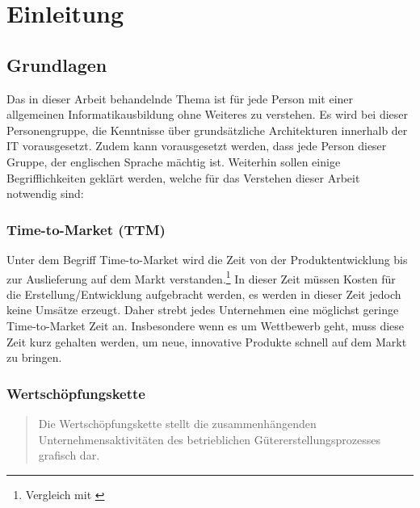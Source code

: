 \chapter{Einleitung}
\label{chap:einleitung}

\section{Grundlagen}
\label{sec:Grundlagen}
Das in dieser Arbeit behandelnde Thema ist für jede Person mit einer allgemeinen Informatikausbildung ohne Weiteres zu verstehen. Es wird bei dieser Personengruppe, die Kenntnisse über grundsätzliche Architekturen innerhalb der IT vorausgesetzt. Zudem kann vorausgesetzt werden, dass jede Person dieser Gruppe, der englischen Sprache mächtig ist. Weiterhin sollen einige Begrifflichkeiten geklärt werden, welche für das Verstehen dieser Arbeit notwendig sind:

\subsection{Time-to-Market (TTM)}
\label{subsec:ttm}
Unter dem Begriff Time-to-Market wird die Zeit von der Produktentwicklung bis zur Auslieferung auf dem Markt verstanden.\footnote{Vergleich mit \cite{ttm:BusinessDictionary}}  In dieser Zeit müssen Kosten für die Erstellung/Entwicklung aufgebracht werden, es werden in dieser Zeit jedoch keine Umsätze erzeugt. Daher strebt jedes Unternehmen eine möglichst geringe Time-to-Market Zeit an. Insbesondere wenn es um Wettbewerb geht, muss diese Zeit kurz gehalten werden, um neue, innovative Produkte schnell auf dem Markt zu bringen.

\subsection{Wertschöpfungskette}
\label{subsec:Wertschoepfungskette}
\begin{quotation}
\frqq Die Wertschöpfungskette stellt die zusammenhängenden Unternehmensaktivitäten des betrieblichen Gütererstellungsprozesses grafisch dar.\flqq \cite{gabler}
\end{quotation}

